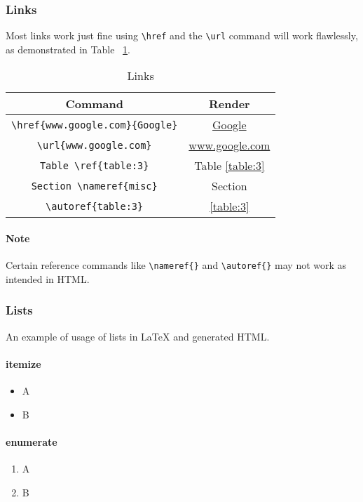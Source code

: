\subsubsection{Links}
Most links work just fine using \verb|\href| and the \verb|\url| command will work flawlessly, as demonstrated in Table ~\ref{table:4}.

\begin{table}[htbp]
\centering
\begin{tabular}{| c | c |}
 \hline
 Command & Render \\
 \hline
 \verb|\href{www.google.com}{Google}| & \href{www.google.com}{Google} \\ \hline
\verb|\url{www.google.com}| & \url{www.google.com}  \\ \hline
\verb|Table \ref{table:3}| & Table \ref{table:3}  \\ \hline
\verb|Section \nameref{misc}| & Section \nameref{misc}\\ \hline
\verb|\autoref{table:3}| & \autoref{table:3} \\ \hline
\end{tabular}
\caption{Links}
\label{table:4}
\end{table}

\paragraph{Note}
Certain reference commands like \verb|\nameref{}| and \verb|\autoref{}| may not work as intended in HTML.

\subsubsection{Lists}

An example of usage of lists in LaTeX and  generated HTML.

\paragraph{itemize}
\begin{itemize}
\item A
\item B
\end{itemize}
\paragraph{enumerate}
\begin{enumerate}
\item A
\item B
\end{enumerate}
